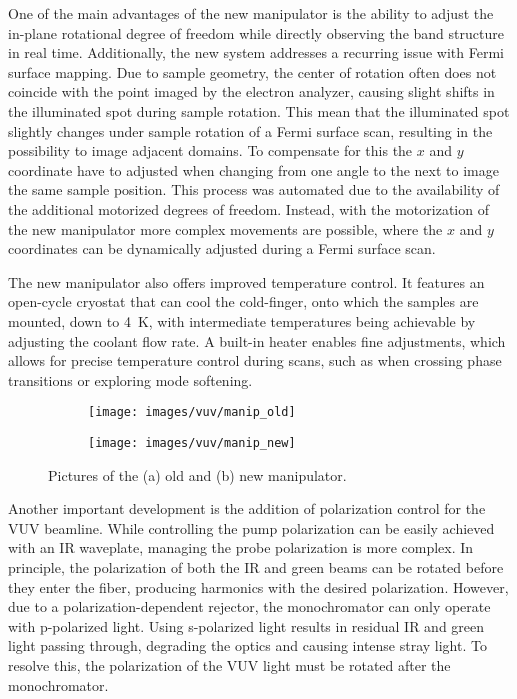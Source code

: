 One of the main advantages of the new manipulator is the ability to adjust the in-plane rotational degree of freedom while directly observing the band structure in real time.
Additionally, the new system addresses a recurring issue with Fermi surface mapping.
Due to sample geometry, the center of rotation often does not coincide with the point imaged by the electron analyzer, causing slight shifts in the illuminated spot during sample rotation.
This mean that the illuminated spot slightly changes under sample rotation of a Fermi surface scan, resulting in the possibility to image adjacent domains.
To compensate for this the $x$ and $y$ coordinate have to adjusted when changing from one angle to the next to image the same sample position.
This process was automated due to the availability of the additional motorized degrees of freedom.
Instead, with the motorization of the new manipulator more complex movements are possible, where the $x$ and $y$ coordinates can be dynamically adjusted during a Fermi surface scan.

The new manipulator also offers improved temperature control.
It features an open-cycle cryostat that can cool the cold-finger, onto which the samples are mounted, down to \qty{4}{\kelvin}, with intermediate temperatures being achievable by adjusting the coolant flow rate.
A built-in heater enables fine adjustments, which allows for precise temperature control during scans, such as when crossing phase transitions or exploring mode softening.

\begin{figure}[h]
	\centering
	\begin{subfigure}[b]{0.46\textwidth}
		\texttt{[image: images/vuv/manip\_old]}
		\caption{}
	\end{subfigure}
	\begin{subfigure}[b]{0.46\textwidth}
		\texttt{[image: images/vuv/manip\_new]}
		\caption{}
	\end{subfigure}
	\caption{Pictures of the (a) old and (b) new manipulator.}
	\label{fig:manip_full}
\end{figure}

Another important development is the addition of polarization control for the VUV beamline.
While controlling the pump polarization can be easily achieved with an IR waveplate, managing the probe polarization is more complex.
In principle, the polarization of both the IR and green beams can be rotated before they enter the fiber, producing harmonics with the desired polarization.
However, due to a polarization-dependent rejector, the monochromator can only operate with p-polarized light.
Using s-polarized light results in residual IR and green light passing through, degrading the optics and causing intense stray light.
To resolve this, the polarization of the VUV light must be rotated after the monochromator.

